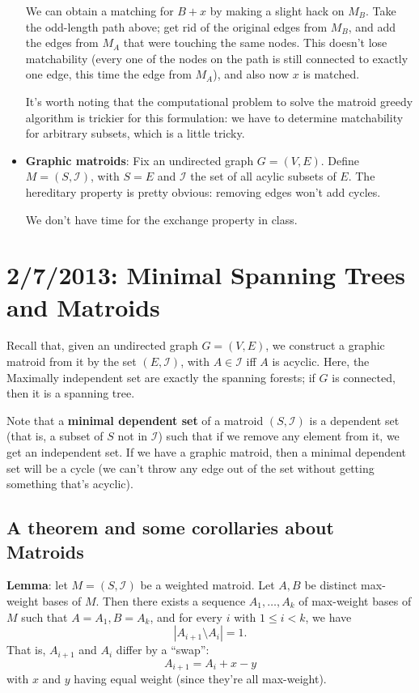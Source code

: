 \documentclass{article}
\newcommand{\I}{\mathcal{I}}
\begin{document}
\begin{itemize}
	We can obtain a matching for $B + x$ by making a slight
	hack on $M_B$.
	Take the odd-length path above; get rid of the original edges
	from $M_B$, and add the edges from $M_A$ that were touching
	the same nodes.
	This doesn't lose matchability (every one of the nodes on the
	path is still connected to exactly one edge, this time the edge
	from $M_A$), and also now $x$ is matched.
	
	It's worth noting that the computational problem to solve the matroid
	greedy algorithm is trickier for this formulation: we have to determine
	matchability for arbitrary subsets, which is a little tricky.
	
	\item
	\textbf{Graphic matroids}:
	Fix an undirected graph $G=(V,E)$.
	Define $M = (S,\mathcal I)$, with $S = E$
	and
	$\mathcal I$ the set of all acylic subsets of $E$.
	The hereditary property is pretty obvious: removing edges won't
	add cycles.
	
	We don't have time for the exchange property in class.
	
	
\end{itemize}
 



\section{2/7/2013: Minimal Spanning Trees and Matroids}

Recall that, given an undirected graph $G=(V,E)$, we construct a graphic
matroid from it by the set $(E,\I)$, with $A\in\I$ iff $A$ is acyclic.
Here, the Maximally independent set are exactly the spanning forests;
if $G$ is connected, then it is a spanning tree.

Note that a \textbf{minimal dependent set} of a matroid $(S,\I)$ 
is a dependent set (that is, a subset of $S$ not in $\I$) such that if we
remove any element from it, we get an independent set.
If we have a graphic matroid, then a minimal dependent set will be a cycle
(we can't throw any edge out of the set without getting something
that's acyclic).

\subsection{A theorem and some corollaries about Matroids}

\textbf{Lemma}:
let $M=(S, \I)$ be a weighted matroid.
Let $A,B$ be distinct max-weight bases of
$M$.
Then there exists a sequence $A_1, \ldots, A_k$ of max-weight bases of $M$
such that $A=A_1, B=A_k$, and for every $i$ with $1\leq i < k$, we have
$$
|A_{i+1} \setminus A_i| = 1.
$$
That is, $A_{i+1}$ and $A_i$ differ by a ``swap'':
$$
A_{i+1} = A_i + x - y
$$
with $x$ and $y$ having equal weight (since they're all max-weight).
\end{document}

